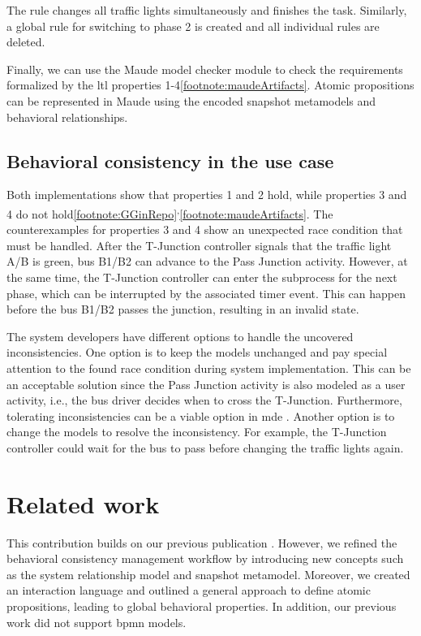 \documentclass{jot}
\begin{document}


The rule changes all traffic lights simultaneously and finishes the task.
Similarly, a global rule for switching to phase 2 is created and all individual rules are deleted.

Finally, we can use the Maude model checker module to check the requirements formalized by the \gls*{ltl} properties 1-4\cref{footnote:maudeArtifacts}.
Atomic propositions can be represented in Maude using the encoded snapshot metamodels and behavioral relationships.

\subsection{Behavioral consistency in the use case}

Both implementations show that properties 1 and 2 hold, while properties 3 and 4 do not hold\cref{footnote:GGinRepo}\textsuperscript{,}\cref{footnote:maudeArtifacts}.
The counterexamples for properties 3 and 4 show an unexpected race condition that must be handled.
After the T-Junction controller signals that the traffic light A/B is green, bus B1/B2 can advance to the \textsf{Pass Junction} activity.
However, at the same time, the T-Junction controller can enter the subprocess for the next phase, which can be interrupted by the associated timer event.
This can happen before the bus B1/B2 passes the junction, resulting in an invalid state.

The system developers have different options to handle the uncovered inconsistencies.
One option is to keep the models unchanged and pay special attention to the found race condition during system implementation.
This can be an acceptable solution since the \textsf{Pass Junction} activity is also modeled as a user activity, i.e., the bus driver decides when to cross the T-Junction.
Furthermore, tolerating inconsistencies can be a viable option in \gls*{mde} \cite{weidmannToleranceModelDrivenEngineering2021}.
Another option is to change the models to resolve the inconsistency.
For example, the T-Junction controller could wait for the bus to pass before changing the traffic lights again.

\section{Related work} \label{sec:related_work}
This contribution builds on our previous publication \cite{krauterBehavioralConsistencyHeterogeneous2021}.
However, we refined the behavioral consistency management workflow by introducing new concepts such as the system relationship model and snapshot metamodel.
Moreover, we created an interaction language and outlined a general approach to define atomic propositions, leading to global behavioral properties.
In addition, our previous work did not support \gls*{bpmn} models.
\end{document}
